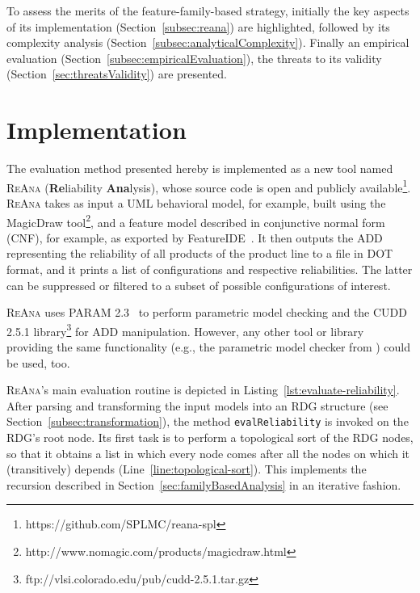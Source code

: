 To assess the merits of the feature-family-based strategy, initially the key
aspects of its implementation (Section~\ref{subsec:reana}) are highlighted,
followed by its complexity analysis (Section~\ref{subsec:analyticalComplexity}).
Finally an empirical evaluation (Section~\ref{subsec:empiricalEvaluation}), the
threats to its validity (Section~\ref{sec:threatsValidity}) are presented.


\section{Implementation   \label{subsec:reana}}


The evaluation method presented hereby is implemented as a new tool named
\textsc{ReAna} (\textbf{Re}liability \textbf{Ana}lysis), whose source code is
open and publicly available\footnote{https://github.com/SPLMC/reana-spl}.
\textsc{ReAna} takes as input a UML behavioral model, for example, built using
the MagicDraw tool\footnote{http://www.nomagic.com/products/magicdraw.html}, and
a feature model described in conjunctive normal form (CNF), for example, as
exported by FeatureIDE~\cite{featureide}. It then outputs the ADD representing
the reliability of all products of the product line to a file in DOT format, and
it prints a list of configurations and respective reliabilities. The latter can
be suppressed or filtered to a subset of possible configurations of interest.

\textsc{ReAna} uses PARAM 2.3~\cite{Hahn_param_2010} to perform parametric model
checking and the CUDD 2.5.1
library\footnote{ftp://vlsi.colorado.edu/pub/cudd-2.5.1.tar.gz} for ADD
manipulation. However, any other tool or library providing the same
functionality (e.g., the parametric model checker from
\citet{Filieri_pmctool_2012}) could be used, too.

\textsc{ReAna}'s main evaluation routine is depicted in
Listing~\ref{lst:evaluate-reliability}. After parsing and transforming the input
models into an RDG structure (see Section~\ref{subsec:transformation}), the
method \texttt{evalReliability} is invoked on the RDG's root node.  Its first
task is to perform a topological sort of the RDG nodes, so that it obtains a
list in which every node comes after all the nodes on which it (transitively)
depends (Line~\ref{line:topological-sort}).  This implements the recursion
described in Section~\ref{sec:familyBasedAnalysis} in an iterative fashion.

